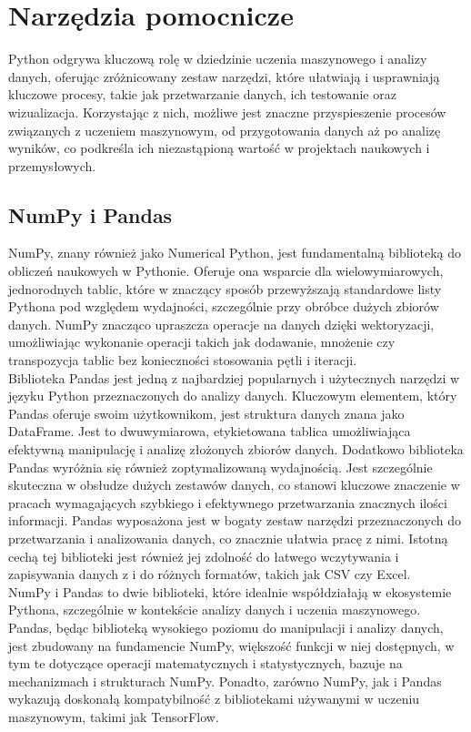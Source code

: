 \documentclass[a4paper,twoside,12pt]{book}
\begin{document}
\section{Narzędzia pomocnicze}
Python odgrywa kluczową rolę w dziedzinie uczenia maszynowego i analizy danych, oferując zróżnicowany zestaw narzędzi, które ułatwiają i usprawniają kluczowe procesy, takie jak przetwarzanie danych, ich testowanie oraz wizualizacja. Korzystając z nich, możliwe jest znaczne przyspieszenie procesów związanych z uczeniem maszynowym, od przygotowania danych aż po analizę wyników, co podkreśla ich niezastąpioną wartość w projektach naukowych i przemysłowych.
\subsection{NumPy i Pandas}
NumPy, znany również jako Numerical Python, jest fundamentalną biblioteką do obliczeń naukowych w Pythonie. Oferuje ona wsparcie dla wielowymiarowych, jednorodnych tablic, które w znaczący sposób przewyższają standardowe listy Pythona pod względem wydajności, szczególnie przy obróbce dużych zbiorów danych. NumPy znacząco upraszcza operacje na danych dzięki wektoryzacji, umożliwiając wykonanie operacji takich jak dodawanie, mnożenie czy transpozycja tablic bez konieczności stosowania pętli i iteracji.\\

Biblioteka Pandas jest jedną z najbardziej popularnych i użytecznych narzędzi w języku Python przeznaczonych do analizy danych. Kluczowym elementem, który Pandas oferuje swoim użytkownikom, jest struktura danych znana jako DataFrame. Jest to dwuwymiarowa, etykietowana tablica umożliwiająca efektywną manipulację i analizę złożonych zbiorów danych. Dodatkowo biblioteka Pandas wyróżnia się również zoptymalizowaną wydajnością. Jest szczególnie skuteczna w obsłudze dużych zestawów danych, co stanowi kluczowe znaczenie w pracach wymagających szybkiego i efektywnego przetwarzania znacznych ilości informacji. Pandas wyposażona jest w bogaty zestaw narzędzi przeznaczonych do przetwarzania i analizowania danych, co znacznie ułatwia pracę z nimi. Istotną cechą tej biblioteki jest również jej zdolność do łatwego wczytywania i zapisywania danych z i do różnych formatów, takich jak CSV czy Excel.\\

NumPy i Pandas to dwie biblioteki, które idealnie współdziałają w ekosystemie Pythona, szczególnie w kontekście analizy danych i uczenia maszynowego. Pandas, będąc biblioteką wysokiego poziomu do manipulacji i analizy danych, jest zbudowany na fundamencie NumPy, większość funkcji w niej dostępnych, w tym te dotyczące operacji matematycznych i statystycznych, bazuje na mechanizmach i strukturach NumPy.
Ponadto, zarówno NumPy, jak i Pandas wykazują doskonałą kompatybilność z bibliotekami używanymi w uczeniu maszynowym, takimi jak TensorFlow.
\newpage
\end{document}
